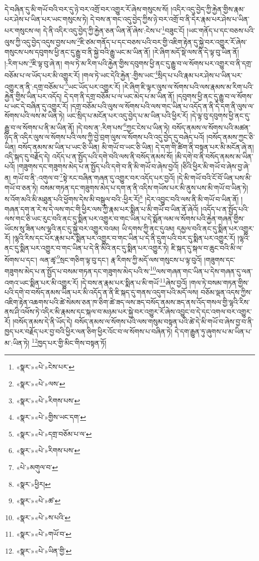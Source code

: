 དེ་བཞིན་དུ་མི་གཡོ་བའི་བར་དུ་ཉེ་བར་འགྲོ་བར་འགྱུར་རོ་ཞེས་གསུངས་སོ། །འདིར་འདུ་བྱེད་ཀྱི་རྐྱེན་གྱིས་རྣམ་པར་ཤེས་པ་ཡིན་པར་ཡང་གསུངས་ཏེ། དེ་བས་ན་གང་འདུ་བྱེད་ཀྱིས་ཉེ་བར་འགྲོ་བ་ནི་དེར་རྣམ་པར་ཤེས་པ་ཡིན་པར་གསུངས་ལ། དེ་ནི་འདིར་འདུ་བྱེད་ཀྱི་རྐྱེན་ཅན་ཡིན་ནོ་ཞེས་:ངེས་པ་\footnote{«སྣར་»«པེ་»ངེས་པར་}བཟུང་ངོ། །ཡང་གནོད་པ་དང་བཅས་པའི་ལུས་ཀྱི་འདུ་བྱེད་འདུས་བྱས་པས་\footnote{«སྣར་»«པེ་»ལས་}ཇི་ཙམ་གནོད་པ་དང་བཅས་པའི་བར་གྱི་འཇིག་རྟེན་དུ་སྐྱེ་བར་འགྱུར་རོ་ཞེས་གསུངས་པས་དབུགས་ཕྱི་ནང་དུ་རྒྱུ་བ་ནི་སྐྱེ་བའི་རྒྱུ་ཡང་མ་ཡིན་ནོ། །རེ་ཞིག་མདོ་སྡེ་ལས་ནི་དེ་ལྟ་བུ་ཡིན་ནོ། །:རིག་པས་\footnote{«སྣར་»«པེ་»རིགས་པས་}ཇི་ལྟ་བུ་ཞེ་ན། གལ་ཏེ་མ་རིག་པའི་རྐྱེན་གྱིས་དབུགས་ཕྱི་ནང་དུ་རྒྱུ་བ་ལ་སོགས་པར་འགྱུར་བ་ནི་དགྲ་བཅོམ་པ་ལ་ཡོད་པར་མི་འགྱུར་རོ། །གལ་ཏེ་ཡང་དེའི་རྐྱེན་:གྱིས་ཡང་\footnote{«སྣར་»«པེ་»གྱིས་ཡང་དག་}སྲིད་པ་པའི་རྣམ་པར་ཤེས་པ་ཡིན་པར་འགྱུར་ན་ནི་:དགྲ་བཅོམ་པ་\footnote{«སྣར་»«པེ་»དགྲ་བཅོམ་པ་ལ་}ཡང་ཡོད་པར་འགྱུར་རོ། །རེ་ཞིག་ཇི་ལྟར་ལུས་ལ་སོགས་པའི་ལས་རྣམས་མ་རིག་པའི་རྐྱེན་གྱིས་ཡིན་པར་འདོད། དེ་དག་ནི་དགྲ་བཅོམ་པ་ལ་ཡང་མེད་པ་མ་ཡིན་ནོ། །དབུགས་ཕྱི་ནང་དུ་རྒྱུ་བ་ལ་སོགས་པ་ཡང་དེ་བཞིན་དུ་འགྱུར་རོ། །དགྲ་བཅོམ་པའི་ལུས་ལ་སོགས་པའི་ལས་གང་ཡིན་པ་འདོད་ན་ནི་དེ་དག་ནི་ལུས་ལ་སོགས་པའི་ལས་མ་ཡིན་ཏེ། ཡང་སྲིད་པ་མངོན་པར་འདུ་བྱེད་པ་མ་ཡིན་པའི་ཕྱིར་རོ། །དེ་ལྟ་བུ་དབུགས་ཕྱི་ནང་དུ་རྒྱུ་བ་ལ་སོགས་པ་ནི་མ་ཡིན་ནོ། །དེ་བས་ན་:རིག་པས་\footnote{«སྣར་»«པེ་»རིགས་པས་}ཀྱང་ངེས་པ་ཡིན་ཏེ། བསོད་ནམས་ལ་སོགས་པའི་མཚན་ཉིད་ནི་འདིར་ལུས་ལ་སོགས་པའི་ལས་ཀྱི་བྱེ་བྲག་ལུས་ལ་སོགས་པའི་འདུ་བྱེད་དུ་བཞེད་པའོ། །བསོད་ནམས་ཀྱང་ཅི་ཡིན། བསོད་ནམས་མ་ཡིན་པ་ཡང་ཅི་ཡིན། མི་གཡོ་བ་ཡང་ཅི་ཡིན། དེ་དག་གི་ཚིག་ནི་བསྟན་པར་མི་མངོན་ཞེ་ན། འདི་སྐད་དུ་བརྗོད་དེ། འདོད་པ་ན་སྤྱོད་པའི་དགེ་བའི་ལས་ནི་བསོད་ནམས་སོ། །མི་དགེ་བ་ནི་བསོད་ནམས་མ་ཡིན་པའོ། །གཟུགས་དང་གཟུགས་མེད་པ་ན་སྤྱོད་པའི་དགེ་བ་ནི་མི་གཡོ་བ་ཞེས་བྱའོ། །ཅིའི་ཕྱིར་མི་གཡོ་བ་ཞེས་བྱ་ཞེ་ན། གཡོ་བ་ནི་:འགུལ་བ་\footnote{«པེ་»མགུལ་བ་}སྟེ་རང་བཞིན་གཞན་དུ་འགྱུར་བར་འདོད་པར་བྱའོ། །དེ་མི་གཡོ་བའི་ངོ་བོ་ཡིན་པས་མི་གཡོ་བ་ཅན་ཏེ། བསམ་གཏན་དང་གཟུགས་མེད་པ་དག་ན་ནི་འདིས་གཡོས་པར་མི་ནུས་པས་མི་གཡོ་བ་ཡིན་ཏེ། ས་འོག་མའི་མི་མཐུན་པའི་ཕྱོགས་དེས་མི་བསྒུལ་བའི་:ཕྱིར་རོ།\footnote{«སྣར་»ཕྱིར།} །དེར་འབྱུང་བའི་ལས་ནི་མི་གཡོ་བ་ཡིན་ནོ། །གཞན་དག་ན་རེ་ས་དེ་ལས་གང་གི་ཕྱིར་ལས་ཀྱི་རྣམ་པར་སྨིན་པ་མི་གཡོ་བ་ཡིན་ནོ་ཞེའོ། །འདོད་པ་ན་སྤྱོད་པའི་ལས་གང་ཅི་ཡང་རུང་བའི་ནང་དུ་སྨིན་པར་འགྱུར་བ་གང་ཡིན་པ་དེ་སྨོན་ལམ་ལ་སོགས་པའི་རྐྱེན་གཞན་གྱིས་ཡོངས་སུ་ཟིན་པས་ལྷའི་ནང་དུ་སྐྱེ་བར་འགྱུར་བའམ། ཡི་དགས་ཀྱི་ནང་དུའམ། དམྱལ་བའི་ནང་དུ་སྨིན་པར་འགྱུར་རོ། །ལྷའི་རིས་དང་པོར་རྣམ་པར་སྨིན་པར་འགྱུར་བ་གང་ཡིན་པ་དེ་ནི་དྲུག་པའི་བར་དུ་སྨིན་པར་འགྱུར་རོ། །ལྷའི་ནང་དུ་སྨིན་པར་འགྱུར་བ་གང་ཡིན་པ་དེ་ནི་མིའི་ནང་དུ་སྨིན་པར་འགྱུར་ཏེ། ཇི་སྐད་དུ་སྐལ་བ་ཆུང་བའི་མི་ལ་སོགས་པ་དང་། ལན་ཚྭ་\footnote{«སྣར་»«པེ་»ཚ་}སྲང་གཅིག་ལྟ་བུ་དང་། རྣ་རིགས་ཀྱི་མདོ་ལས་གསུངས་པ་ལྟ་བུའོ། །གཟུགས་དང་གཟུགས་མེད་པ་ན་སྤྱོད་པ་བསམ་གཏན་དང་གཟུགས་མེད་པའི་ས་\footnote{«སྣར་»«པེ་»ས་པའི་}ལས་གཞན་གང་ཡིན་པ་དེས་གཞན་དུ་ལན་འགའ་ཡང་སྨིན་པར་མི་འགྱུར་རོ། །དེ་བས་ན་རྣམ་པར་སྨིན་པ་མི་གཡོ་\footnote{«སྣར་»«པེ་»གཡོ་བ་}ཞེས་བྱའོ། །གལ་ཏེ་བསམ་གཏན་གྱིས་པའི་དགེ་བ་བསོད་ནམས་ཡིན་པར་མི་འདོད་ན་ནི་ཇི་སྐད་དུ་གནས་འདུག་པའི་མདོ་ལས། བཅོམ་ལྡན་འདས་ཀྱིས་འཇིག་རྟེན་འཆགས་པའི་ཚེ་སེམས་ཅན་ཁ་ཅིག་ཚེ་ཟད་ལས་ཟད་བསོད་ནམས་ཟད་ནས་འོད་གསལ་གྱི་ལྷའི་རིས་ནས་ཤི་འཕོས་ཏེ་འདིར་མི་རྣམས་དང་སྐལ་བ་མཉམ་པར་སྐྱེ་བར་འགྱུར་རོ་ཞེས་འབྱུང་བ་དེ་དང་འགལ་བར་འགྱུར་རོ། །བསོད་ནམས་དེ་ནི་ཡོད་དེ། བསོད་ནམས་ལ་སོགས་པའི་ལས་གསུམ་བསྟན་པའི་ཚེ་དེ་མི་གཡོ་བ་ཞེས་བྱ་བ་ནི་ཁྱད་པར་བརྗོད་པར་བྱ་བའི་ཕྱིར་ལན་ཅིག་ཕྱིར་འོང་བ་ལ་སོགས་པ་བཞིན་ཏེ། དེ་དག་རྒྱུན་ཏུ་ཞུགས་པ་མ་ཡིན་པ་མ་:ཡིན་ཏེ། \footnote{«སྣར་»«པེ་»ཡིན་གྱི་}ཁྱད་པར་གྱི་མིང་གིས་བསྟན་ཏོ། 